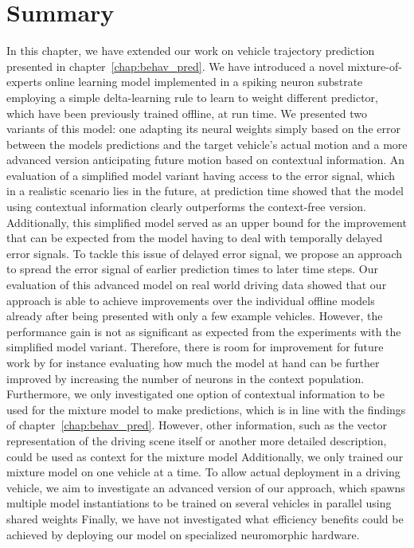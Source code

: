 \section{Summary}
\label{sec:online_learn_summ}

In this chapter, we have extended our work on vehicle trajectory prediction presented in chapter~\ref{chap:behav_pred}.
We have introduced a novel mixture-of-experts online learning model implemented in a spiking neuron substrate employing a simple delta-learning rule to learn to weight different predictor, which have been previously trained offline, at run time.
We presented two variants of this model: one adapting its neural weights simply based on the error between the models predictions and the target vehicle's actual motion and a more advanced version anticipating future motion based on contextual information.
An evaluation of a simplified model variant having access to the error signal, which in a realistic scenario lies in the future, at prediction time showed that the model using contextual information clearly outperforms the context-free version.
Additionally, this simplified model served as an upper bound for the improvement that can be expected from the model having to deal with temporally delayed error signals.
To tackle this issue of delayed error signal, we propose an approach to spread the error signal of earlier prediction times to later time steps.
Our evaluation of this advanced model on real world driving data showed that our approach is able to achieve improvements over the individual offline models already after being presented with only a few example vehicles.
However, the performance gain is not as significant as expected from the experiments with the simplified model variant.
Therefore, there is room for improvement for future work by for instance evaluating how much the model at hand can be further improved by increasing the number of neurons in the context population.
Furthermore, we only investigated one option of contextual information to be used for the mixture model to make predictions, which is in line with the findings of chapter~\ref{chap:behav_pred}.
However, other information, such as the vector representation of the driving scene itself or another more detailed description, could be used as context for the mixture model
Additionally, we only trained our mixture model on one vehicle at a time.
To allow actual deployment in a driving vehicle, we aim to investigate an advanced version of our approach, which spawns multiple model instantiations to be trained on several vehicles in parallel using shared weights
Finally, we have not investigated what efficiency benefits could be achieved by deploying our model on specialized neuromorphic hardware.
